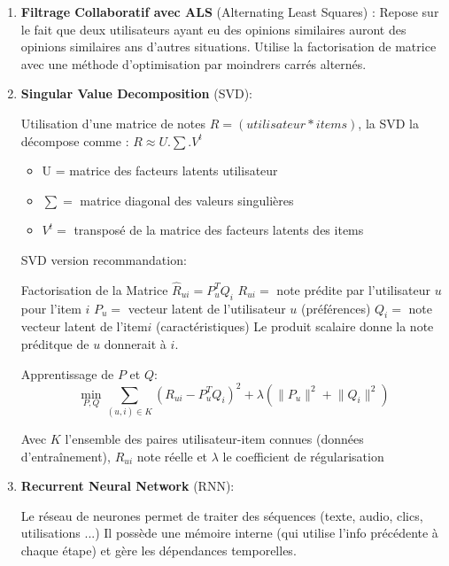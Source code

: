 \documentclass{article}
\begin{document}
    \begin{enumerate}
        \item \textbf{Filtrage Collaboratif avec ALS} (Alternating Least Squares) :
        Repose sur le fait que deux utilisateurs ayant eu des opinions similaires auront des opinions similaires ans d'autres situations. Utilise la factorisation de matrice avec une méthode d'optimisation par moindrers carrés alternés.
        \item \textbf{Singular Value Decomposition} (SVD):

        Utilisation d'une matrice de notes \(R = (utilisateur*items)\), la SVD la décompose comme : \(R \approx U . \sum .
        V^t\)

        \begin{itemize}
            \item U = matrice des facteurs latents utilisateur
            \item \(\sum=\) matrice diagonal des valeurs singulières
            \item \(V^t=\) transposé de la matrice des facteurs latents des items
        \end{itemize}
        SVD version recommandation:

        Factorisation de la Matrice \(\hat{R}_{ui} = P_u^T Q_i \)
        \newline
        \( R_{ui} = \) note prédite par l'utilisateur \(u\) pour l'item \(i\)
        \newline
        \(P_u = \) vecteur latent de l'utilisateur \(u\) (préférences)
        \newline
        \(Q_i = \) note vecteur latent de l'item\(i\) (caractéristiques)
        \newline
        Le produit scalaire donne la note préditque de \(u\) donnerait à \(i\).

        Apprentissage de \(P\) et \(Q\): \[ \min_{P, Q} \sum_{(u,i) \in K} \left( R_{ui} - P_u^T Q_i \right)^2 + \lambda \left( \lVert P_u \rVert^2 + \lVert Q_i \rVert^2 \right)\]

        Avec \(K\) l'ensemble des paires utilisateur-item connues (données d'entraînement), \(R_{ui}\) note réelle et \(\lambda\) le coefficient de régularisation

        \item \textbf{Recurrent Neural Network} (RNN):

        Le réseau de neurones permet de traiter des séquences (texte, audio, clics, utilisations ...) Il possède une mémoire interne (qui utilise l'info précédente à chaque étape) et gère les dépendances temporelles.


\end{enumerate}
\end{document}

